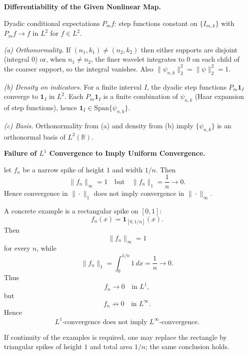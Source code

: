 \begin{problem}[CP-II-0430]
\label{prob:cp-ii-0430}
\textbf{Differentiability of the Given Nonlinear Map.}

\hspace*{1.5em}Dyadic conditional expectations $P_m f$: step functions constant on $\{I_{m,k}\}$ with $P_m f\to f$ in $L^2$ for $f\in L^2$.
\end{problem}

\begin{solution}
\emph{(a) Orthonormality.} If $(n_1,k_1)\neq(n_2,k_2)$ then either supports are disjoint (integral $0$) or,
when $n_1\neq n_2$, the finer wavelet integrates to $0$ on each child of the coarser support, so the integral vanishes.
Also $\|\psi_{n,k}\|_2^2=\|\psi\|_2^2=1$.

\smallskip
\emph{(b) Density on indicators.} For a finite interval $I$, the dyadic step functions $P_m\mathbf 1_I$ converge to
$\mathbf 1_I$ in $L^2$. Each $P_m\mathbf 1_I$ is a finite combination of $\psi_{n,k}$ (Haar expansion of step functions),
hence $\mathbf 1_I\in\overline{\mathrm{Span}}\{\psi_{n,k}\}$.

\smallskip
\emph{(c) Basis.} Orthonormality from (a) and density from (b) imply $\{\psi_{n,k}\}$ is an orthonormal basis of $L^2(\mathbb{R})$.
\end{solution}

\begin{problem}[CP-II-0431]
\label{prob:cp-ii-0431}
\textbf{Failure of \(L^1\) Convergence to Imply Uniform Convergence.}

\hspace*{1.5em}let $f_n$ be a narrow spike of height $1$ and width $1/n$. Then
	\[
	\|f_n\|_\infty=1 \quad \text{but} \quad \|f_n\|_1=\frac{1}{n}\to 0.
	\]
	Hence convergence in $\|\cdot\|_1$ does not imply convergence in $\|\cdot\|_\infty$.
\end{problem}

\begin{solution}
A concrete example is a rectangular spike on \([0,1]\):
\[
f_n(x)
=
\mathbf1_{[0,1/n]}(x).
\]
Then
\[
\|f_n\|_\infty=1
\]
for every \(n\), while
\[
\|f_n\|_1
=
\int_0^{1/n}1\,dx
=
\frac1n
\longrightarrow0.
\]
Thus
\[
f_n\to0
\quad\text{in }L^1,
\]
but
\[
f_n\not\to0
\quad\text{in }L^\infty.
\]
Hence
\[
\boxed{
L^1\text{-convergence does not imply }L^\infty\text{-convergence}.
}
\]

If continuity of the examples is required, one may replace the rectangle by triangular spikes
of height \(1\) and total area \(1/n\); the same conclusion holds.
\end{solution}


